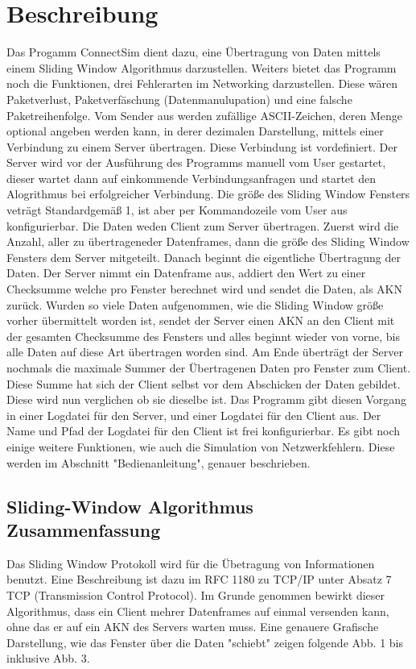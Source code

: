 \documentclass{article}
\begin{document}
\section{Beschreibung}
Das Progamm ConnectSim dient dazu, eine Übertragung von Daten mittels einem Sliding Window Algorithmus darzustellen.
Weiters bietet das Programm noch die Funktionen, drei Fehlerarten im Networking darzustellen. Diese wären Paketverlust,
Paketverfäschung (Datenmanulupation) und eine falsche Paketreihenfolge. Vom Sender aus werden zufällige ASCII-Zeichen, deren
Menge optional angeben werden kann, in derer dezimalen Darstellung, mittels einer Verbindung zu einem Server übertragen. Diese
Verbindung ist vordefiniert. Der Server wird vor der Ausführung des Programms manuell vom User gestartet, dieser wartet dann auf einkommende
Verbindungsanfragen und startet den Alogrithmus bei erfolgreicher Verbindung. \newline
Die größe des Sliding Window Fensters veträgt Standardgemäß 1, ist aber per Kommandozeile vom User aus konfigurierbar.
Die Daten weden Client zum Server übertragen. Zuerst wird die Anzahl, aller zu übertrageneder Datenframes, dann die größe des Sliding Window Fensters
dem Server mitgeteilt. Danach beginnt die eigentliche Übertragung der Daten. Der Server nimmt ein Datenframe aus, addiert den Wert zu einer Checksumme 
welche pro Fenster berechnet wird und sendet die Daten, als AKN zurück. Wurden so viele Daten aufgenommen, wie die Sliding Window größe vorher übermittelt worden
ist, sendet der Server einen AKN an den Client mit der gesamten Checksumme des Fensters und alles beginnt wieder von vorne, bis alle Daten auf diese Art übertragen worden
sind.\newline
Am Ende überträgt der Server nochmals die maximale Summer der Übertragenen Daten pro Fenster zum Client. Diese Summe hat sich der Client selbst vor dem Abschicken der
Daten gebildet. Diese wird nun verglichen ob sie dieselbe ist. 
\newline\newline
Das Programm gibt diesen Vorgang in einer Logdatei für den Server, und einer Logdatei für den Client aus. Der Name und Pfad der Logdatei für den Client ist frei konfigurierbar.
Es gibt noch einige weitere Funktionen, wie auch die Simulation von Netzwerkfehlern. Diese werden im Abschnitt "Bedienanleitung", genauer beschrieben.


\subsection{Sliding-Window Algorithmus Zusammenfassung}
Das Sliding Window Protokoll wird für die Übetragung von Informationen benutzt. Eine Beschreibung ist dazu im RFC 1180 zu TCP/IP unter Absatz 7 TCP (Transmission Control Protocol).
Im Grunde genommen bewirkt dieser Algorithmus, dass ein Client mehrer Datenframes auf einmal versenden kann, ohne das er auf ein AKN des Servers warten muss. Eine genauere Grafische Darstellung,
wie das Fenster über die Daten "schiebt" zeigen folgende Abb. 1 bis inklusive Abb. 3.
\end{document}
